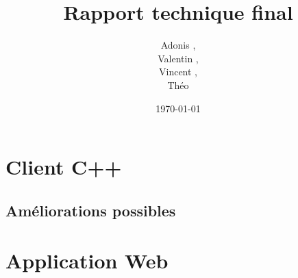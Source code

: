 \documentclass[a4paper]{article}
\title{Rapport technique final}
\author{Adonis \bsc{Najimi},\\
 Valentin \bsc{Stern},\\
 Vincent \bsc{Albert},\\
 Théo \bsc{Gerriet}}
\date{\today}
\begin{document}
\maketitle
\newpage

\section{Client C++}
    \subsection{Améliorations possibles}
    
\newpage
\section{Application Web}

\tableofcontents
\end{document}
